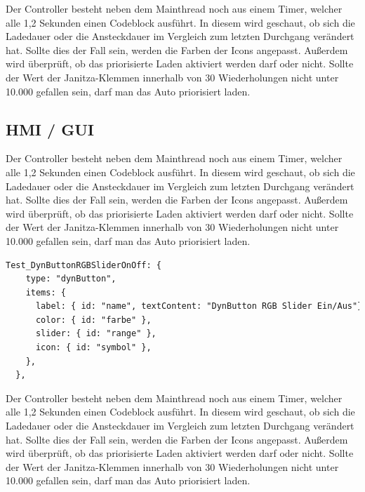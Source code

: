 Der Controller besteht neben dem Mainthread noch aus einem Timer, welcher alle 1,2 Sekunden einen Codeblock ausführt. In diesem wird geschaut, ob sich die Ladedauer oder die Ansteckdauer im Vergleich zum letzten Durchgang verändert hat. Sollte dies der Fall sein, werden die Farben der Icons angepasst. Außerdem wird überprüft, ob das priorisierte Laden aktiviert werden darf oder nicht. Sollte der Wert der Janitza-Klemmen innerhalb von 30 Wiederholungen nicht unter 10.000 gefallen sein, darf man das Auto priorisiert laden. 

\subsection*{HMI / GUI}
Der Controller besteht neben dem Mainthread noch aus einem Timer, welcher alle 1,2 Sekunden einen Codeblock ausführt. In diesem wird geschaut, ob sich die Ladedauer oder die Ansteckdauer im Vergleich zum letzten Durchgang verändert hat. Sollte dies der Fall sein, werden die Farben der Icons angepasst. Außerdem wird überprüft, ob das priorisierte Laden aktiviert werden darf oder nicht. Sollte der Wert der Janitza-Klemmen innerhalb von 30 Wiederholungen nicht unter 10.000 gefallen sein, darf man das Auto priorisiert laden. 

\begin{lstlisting}[language=HTML,caption=Example Element,label=lst:impl:foo]
  Test_DynButtonRGBSliderOnOff: { 
    type: "dynButton", 
    items: { 
      label: { id: "name", textContent: "DynButton RGB Slider Ein/Aus"}, 
      color: { id: "farbe" }, 
      slider: { id: "range" }, 
      icon: { id: "symbol" }, 
    }, 
  }, 
\end{lstlisting}
Der Controller besteht neben dem Mainthread noch aus einem Timer, welcher alle 1,2 Sekunden einen Codeblock ausführt. In diesem wird geschaut, ob sich die Ladedauer oder die Ansteckdauer im Vergleich zum letzten Durchgang verändert hat. Sollte dies der Fall sein, werden die Farben der Icons angepasst. Außerdem wird überprüft, ob das priorisierte Laden aktiviert werden darf oder nicht. Sollte der Wert der Janitza-Klemmen innerhalb von 30 Wiederholungen nicht unter 10.000 gefallen sein, darf man das Auto priorisiert laden. 

